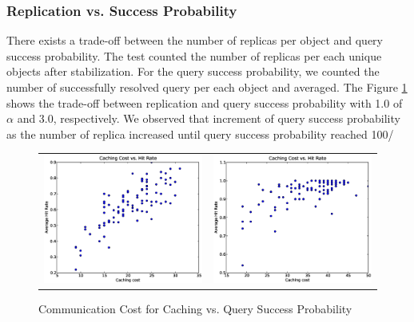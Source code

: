 \documentclass[9.5pt,journal,final,finalsubmission,twocolumn]{IEEEtran}
\begin{document}
\subsubsection{Replication vs. Success Probability}
There exists a trade-off between the number of replicas per object and query success
probability.
The test counted the number of replicas per each unique objects after 
stabilization. For the query success probability, we counted 
the number of successfully resolved query per each object and averaged.
The Figure \ref{fig:plab_cost_hit} shows the trade-off
between replication and query success probability with 1.0 of $\alpha$ and 3.0, 
respectively. 
We observed that increment of query success probability as the number 
of replica increased until query success probability reached 100/%
\begin{center}
\begin{figure}[ht]
\centering
\begin{tabular}{c c}
\begin{minipage}[t]{3in}
\centering
\includegraphics[width=2.5in]{c_cost_vs_hit1.eps}
\end{minipage}
& \begin{minipage}[t]{3in}
\centering
\includegraphics[width=2.5in]{c_cost_vs_hit3.eps}
\end{minipage}\\
\end{tabular}
\caption{Communication Cost for Caching vs. Query Success Probability}
\label{fig:plab_cost_hit}
\end{figure}
\end{center}
\end{document}
